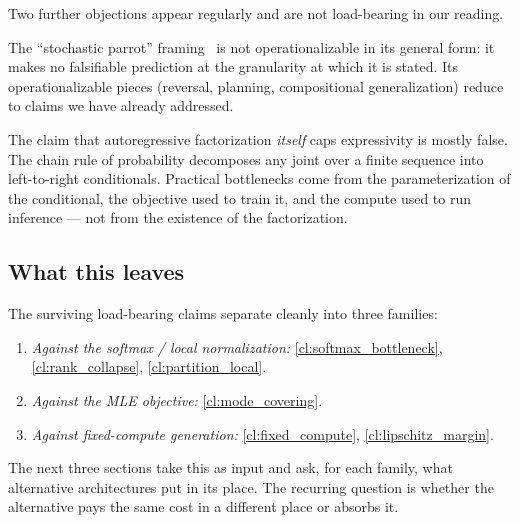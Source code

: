 Two further objections appear regularly and are not load-bearing in our reading.

The ``stochastic parrot'' framing~\citep{bender2021dangers} is not operationalizable in its general form: it makes no falsifiable prediction at the granularity at which it is stated.
Its operationalizable pieces (reversal, planning, compositional generalization) reduce to claims we have already addressed.

The claim that autoregressive factorization \emph{itself} caps expressivity is mostly false.
The chain rule of probability decomposes any joint over a finite sequence into left-to-right conditionals.
Practical bottlenecks come from the parameterization of the conditional, the objective used to train it, and the compute used to run inference --- not from the existence of the factorization.

\subsection{What this leaves}
\label{ssec:what_remains}

The surviving load-bearing claims separate cleanly into three families:
\begin{enumerate}
  \item \emph{Against the softmax / local normalization:} \ref{cl:softmax_bottleneck}, \ref{cl:rank_collapse}, \ref{cl:partition_local}.
  \item \emph{Against the MLE objective:} \ref{cl:mode_covering}.
  \item \emph{Against fixed-compute generation:} \ref{cl:fixed_compute}, \ref{cl:lipschitz_margin}.
\end{enumerate}
The next three sections take this as input and ask, for each family, what alternative architectures put in its place.
The recurring question is whether the alternative pays the same cost in a different place or absorbs it.
